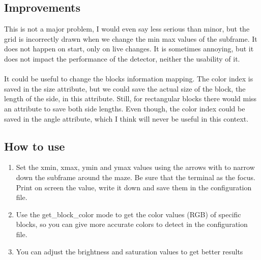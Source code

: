\subsection{Improvements}


This is not a major problem, I would even say less serious than 
minor, but the grid is incorrectly drawn when we change the 
min max values of the subframe. It does not happen on start, 
only on live changes. It is sometimes annoying, but it does not 
impact the performance of the detector, neither the usability of it.
\\
\\
It could be useful to change the blocks information mapping. The color 
index is saved in the size attribute, but we could save the 
actual size of the block, the length of the side, in this attribute. 
Still, for rectangular blocks there would miss an attribute to save 
both side lengths. Even though, the color index could be saved in the 
angle attribute, which I think will never be useful in this context. 

\subsection{How to use}
    \begin{enumerate}
        \item Set the xmin, xmax, ymin and ymax values using the arrows 
            with to narrow down the subframe around the maze. Be sure 
            that the terminal as the focus. Print on screen the value, 
            write it down and save them in the configuration file.
        \item Use the get\_block\_color mode to get the color values (RGB) 
            of specific blocks, so you can give more accurate colors to 
            detect in the configuration file.
        \item You can adjust the brightness and saturation values to get 
            better results
    \end{enumerate}

